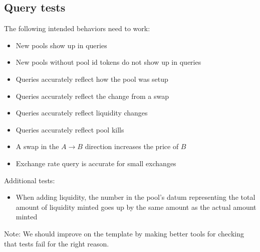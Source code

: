 \documentclass{article}
\begin{document}
\subsection{Query tests}

The following intended behaviors need to work:
\begin{itemize}
	\item New pools show up in queries
	\item New pools without pool id tokens do not show up in queries
	\item Queries accurately reflect how the pool was setup
	\item Queries accurately reflect the change from a swap
	\item Queries accurately reflect liquidity changes
	\item Queries accurately reflect pool kills
	\item A swap in the $A \rightarrow B$ direction increases the price of $B$
	\item Exchange rate query is accurate for small exchanges
\end{itemize}

Additional tests:
\begin{itemize}
	\item When adding liquidity, the number in the pool's datum representing the
    total amount of liquidity minted goes up by the same amount as the actual amount minted
\end{itemize}

Note: We should improve on the template by making better tools for checking that tests fail for the right reason.
\end{document}
